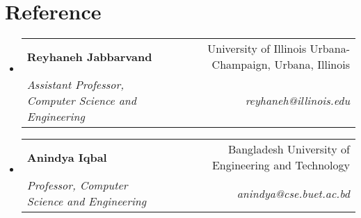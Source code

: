 \documentclass[letterpaper,12pt]{article} %
\makeatletter
\newcommand{\resumeSubheading}[4]{
  \vspace{-2pt}\item
    \begin{tabular*}{0.97\textwidth}[t]{l@{\extracolsep{\fill}}r}
      \textbf{#1} & #2 \\
      \textit{\small#3} & \textit{\small #4} \\
    \end{tabular*}\vspace{-7pt}
}
\newcommand{\resumeSubHeadingListStart}{\begin{itemize}[leftmargin=0.15in, label={}]}
\newcommand{\resumeSubHeadingListEnd}{\end{itemize}}
\makeatother
\begin{document}
\section{Reference}
\resumeSubHeadingListStart
    \resumeSubheading
        {Reyhaneh Jabbarvand}{University of Illinois Urbana-Champaign, Urbana, Illinois}
        {Assistant Professor, Computer Science and Engineering}{reyhaneh@illinois.edu}
    \resumeSubheading
        {Anindya Iqbal}{Bangladesh University of Engineering and Technology}
        {Professor, Computer Science and Engineering}{anindya@cse.buet.ac.bd}
\resumeSubHeadingListEnd
\end{document}

